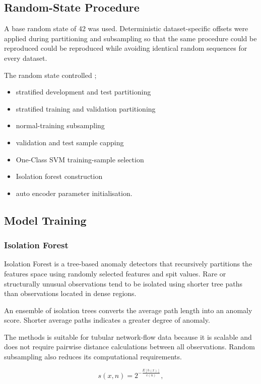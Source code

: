  \subsection {Random-State Procedure}
 
 A base random state of 42 was used. Deterministic dataset-specific  offsets were applied during partitioning and subsampling so that the same procedure could be reproduced could be reproduced while avoiding identical random sequences for every dataset.
 
 The random state controlled ;
 
 \begin{itemize}
 \item stratified development and test partitioning
 \item stratified training and validation partitioning
 \item normal-training subsampling
 \item validation and test sample capping
 \item One-Class SVM training-sample selection
 \item Isolation forest construction
 \item auto encoder parameter initialisation.
 \end{itemize}

\subsection{Model Training}
\subsubsection{Isolation Forest}
\label{subsec:isolation-forest}

Isolation Forest is a tree-based anomaly detectors that recursively partitions the features space using randomly selected features and spit values. Rare or structurally unusual observations tend to be isolated using shorter tree paths than observations located in dense regions.

An ensemble of isolation trees converts the average path length into an anomaly score. Shorter average paths indicates a greater degree of anomaly.

The methods is suitable for tubular network-flow data because it is scalable and does not require pairwise distance calculations between all observations. Random subsampling also reduces its computational requirements.

\begin{equation}
       s(x, n) =
       2^{-\frac{E[h(x)]}{c(n)}},
       \label{eq:isolation-score}
\end{equation}

